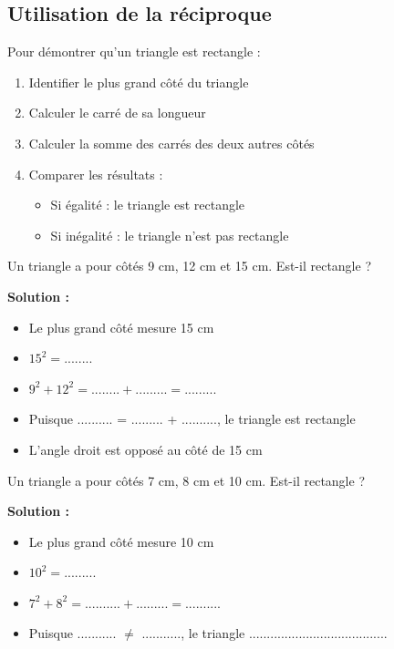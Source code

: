 \subsection{Utilisation de la réciproque}
\begin{methodebox}
Pour démontrer qu'un triangle est rectangle :
\begin{enumerate}
    \item Identifier le plus grand côté du triangle
    \item Calculer le carré de sa longueur
    \item Calculer la somme des carrés des deux autres côtés
    \item Comparer les résultats :
    \begin{itemize}
        \item Si égalité : le triangle est rectangle
        \item Si inégalité : le triangle n'est pas rectangle
    \end{itemize}
\end{enumerate}
\end{methodebox}

\begin{examplebox}
Un triangle a pour côtés 9 cm, 12 cm et 15 cm. Est-il rectangle ?

\textbf{Solution :}
\begin{itemize}
    \item Le plus grand côté mesure 15 cm
    \item $15^2 = ........$
    \item $9^2 + 12^2 = ........ + ......... = .........$
    \item Puisque .......... = ......... + .........., le triangle est rectangle
    \item L'angle droit est opposé au côté de 15 cm
\end{itemize}
\end{examplebox}

\begin{examplebox}
Un triangle a pour côtés 7 cm, 8 cm et 10 cm. Est-il rectangle ?

\textbf{Solution :}
\begin{itemize}
    \item Le plus grand côté mesure 10 cm
    \item $10^2 = .........$
    \item $7^2 + 8^2 = .......... + ......... = ..........$
    \item Puisque ........... $\neq$ ..........., le triangle .......................................
\end{itemize}
\end{examplebox}

